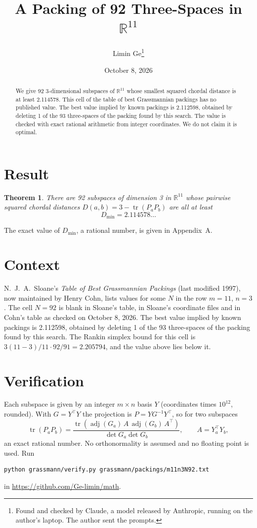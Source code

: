 \documentclass[11pt,a4paper]{article}
\title{A Packing of 92 Three-Spaces in $\mathbb{R}^{11}$}
\author{Limin Ge\thanks{Found and checked by Claude, a model released by Anthropic, running on the author's laptop. The author sent the prompts.}}
\date{October 8, 2026}
\newtheorem*{theorem}{Theorem}
\begin{document}
\maketitle
\begin{abstract}
We give 92 3-dimensional subspaces of $\mathbb{R}^{11}$ whose smallest squared chordal distance is at least 2.114578. This cell of the table of best Grassmannian packings has no published value. The best value implied by known packings is 2.112598, obtained by deleting 1 of the 93 three-spaces of the packing found by this search. The value is checked with exact rational arithmetic from integer coordinates. We do not claim it is optimal.
\end{abstract}

\section{Result}
\begin{theorem}
There are 92 subspaces of dimension 3 in $\mathbb{R}^{11}$ whose pairwise squared chordal distances $D(a,b) = 3 - \operatorname{tr}(P_aP_b)$ are all at least
\[ D_{\min} = 2.114578\ldots \]
\end{theorem}
The exact value of $D_{\min}$, a rational number, is given in Appendix~A.


\section{Context}
N.~J.~A.~Sloane's \emph{Table of Best Grassmannian Packings} (last modified 1997), now maintained by Henry Cohn, lists values for some $N$ in the row $m=11$, $n=3$. The cell $N=92$ is blank in Sloane's table, in Sloane's coordinate files and in Cohn's table as checked on October 8, 2026. The best value implied by known packings is 2.112598, obtained by deleting 1 of the 93 three-spaces of the packing found by this search. The Rankin simplex bound for this cell is $3(11-3)/11\cdot 92/91 = 2.205794$, and the value above lies below it.


\section{Verification}
Each subspace is given by an integer $m\times n$ basis $Y$ (coordinates times $10^{12}$, rounded). With $G=Y^\top Y$ the projection is $P=YG^{-1}Y^\top$, so for two subspaces
\[ \operatorname{tr}(P_aP_b)=\frac{\operatorname{tr}(\operatorname{adj}(G_a)\,A\,\operatorname{adj}(G_b)\,A^\top)}{\det G_a\det G_b},\qquad A=Y_a^\top Y_b, \]
an exact rational number. No orthonormality is assumed and no floating point is used. Run
\begin{verbatim}
python grassmann/verify.py grassmann/packings/m11n3N92.txt
\end{verbatim}
in \url{https://github.com/Ge-limin/math}.
\end{document}
